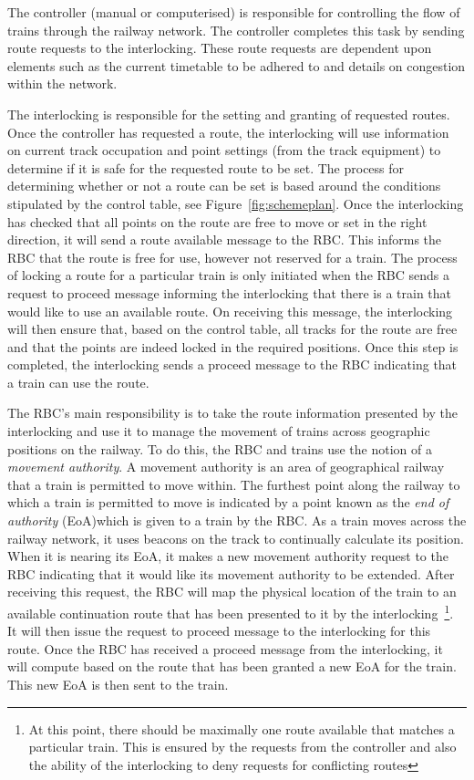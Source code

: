 The controller (manual or computerised) is responsible for controlling
the flow of trains through the railway network. The controller
completes this task by sending route requests to the
interlocking. These route requests are dependent upon elements such as
the current timetable to be adhered to and details on congestion
within the network.

The interlocking is responsible for the setting and granting of
requested routes.  Once the controller has requested a route, the
interlocking will use information on current track occupation and
point settings (from the track equipment) to determine if it is safe
for the requested route to be set. The process for determining whether
or not a route can be set is based around the conditions stipulated by
the control table, see Figure~\ref{fig:schemeplan}. Once the
interlocking has checked that all points on the route are free to move
or set in the right direction, it will send a route available message
to the RBC. This informs the RBC that the route is free for use,
however not reserved for a train. The process of locking a route for a
particular train is only initiated when the RBC sends a request to
proceed message informing the interlocking that there is a train that
would like to use an available route. On receiving this message, the
interlocking will then ensure that, based on the control table, all
tracks for the route are free and that the points are indeed locked in
the required positions. Once this step is completed, the interlocking
sends a proceed message to the RBC indicating that a train can use the
route.

The RBC's main responsibility is to take the route information
presented by the interlocking and use it to manage the movement of
trains across geographic positions on the railway. To do this, the RBC
and trains use the notion of a \emph{movement authority}. A movement
authority is an area of geographical railway that a train is permitted
to move within. The furthest point along the railway to which a train
is permitted to move is indicated by a point known as the \emph{end of
authority} (EoA)which is given to a train by the RBC. As a train moves
across the railway network, it uses beacons on the track to
continually calculate its position. When it is nearing its EoA, it
makes a new movement authority request to the RBC indicating that it
would like its movement authority to be extended. After receiving this
request, the RBC will map the physical location of the train to an
available continuation route that has been presented to it by the
interlocking~\footnote{At this point, there should be maximally one
route available that matches a particular train. This is ensured by
the requests from the controller and also the ability of the
interlocking to deny requests for conflicting routes}. It will then
issue the request to proceed message to the interlocking for this
route. Once the RBC has received a proceed message from the
interlocking, it will compute based on the route that has been granted
a new EoA for the train. This new EoA is then sent to the train.

